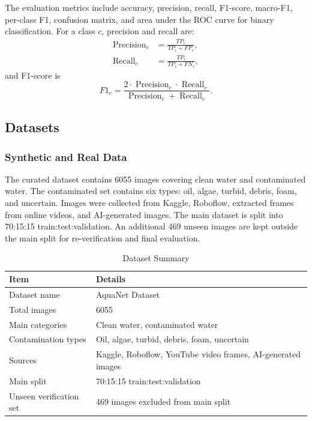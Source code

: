 \documentclass[journal]{IEEEtran}
\newcommand{\dataset}{AquaNet Dataset}
\begin{document}
The evaluation metrics include accuracy, precision, recall, F1-score, macro-F1, per-class F1, confusion matrix, and area under the ROC curve for binary classification. For a class $c$, precision and recall are:
\begin{align}
\operatorname{Precision}_{c} &= \frac{TP_c}{TP_c + FP_c},\\
\operatorname{Recall}_{c} &= \frac{TP_c}{TP_c + FN_c},
\end{align}
and F1-score is
\begin{equation}
F1_c = \frac{2 \cdot \operatorname{Precision}_{c}\cdot \operatorname{Recall}_{c}}{\operatorname{Precision}_{c}+\operatorname{Recall}_{c}}.
\label{eq:f1}
\end{equation}

\subsection{Datasets}
\label{subsec:datasets}

\subsubsection{Synthetic and Real Data}
The curated dataset contains 6055 images covering clean water and contaminated water. The contaminated set contains six types: oil, algae, turbid, debris, foam, and uncertain. Images were collected from Kaggle, Roboflow, extracted frames from online videos, and AI-generated images. The main dataset is split into 70:15:15 train:test:validation. An additional 469 unseen images are kept outside the main split for re-verification and final evaluation.

\begin{table}[!t]
\centering
\caption{Dataset Summary}
\label{tab:dataset_summary}
\begin{tabularx}{\linewidth}{lX}
\toprule
\textbf{Item} & \textbf{Details} \\
\midrule
Dataset name & \dataset{} \\
Total images & 6055 \\
Main categories & Clean water, contaminated water \\
Contamination types & Oil, algae, turbid, debris, foam, uncertain \\
Sources & Kaggle, Roboflow, YouTube video frames, AI-generated images \\
Main split & 70:15:15 train:test:validation \\
Unseen verification set & 469 images excluded from main split \\
\bottomrule
\end{tabularx}
\end{table}
\end{document}
